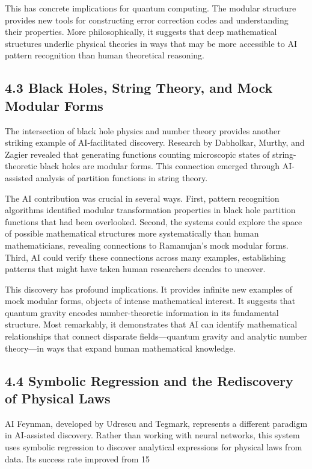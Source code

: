 \documentclass{article}
\begin{document}
This has concrete implications for quantum computing. The modular structure provides new tools for constructing error correction codes and understanding their properties. More philosophically, it suggests that deep mathematical structures underlie physical theories in ways that may be more accessible to AI pattern recognition than human theoretical reasoning.


\subsection{4.3 Black Holes, String Theory, and Mock Modular Forms}

The intersection of black hole physics and number theory provides another striking example of AI-facilitated discovery. Research by Dabholkar, Murthy, and Zagier revealed that generating functions counting microscopic states of string-theoretic black holes are modular forms. This connection emerged through AI-assisted analysis of partition functions in string theory.


The AI contribution was crucial in several ways. First, pattern recognition algorithms identified modular transformation properties in black hole partition functions that had been overlooked. Second, the systems could explore the space of possible mathematical structures more systematically than human mathematicians, revealing connections to Ramanujan's mock modular forms. Third, AI could verify these connections across many examples, establishing patterns that might have taken human researchers decades to uncover.


This discovery has profound implications. It provides infinite new examples of mock modular forms, objects of intense mathematical interest. It suggests that quantum gravity encodes number-theoretic information in its fundamental structure. Most remarkably, it demonstrates that AI can identify mathematical relationships that connect disparate fields—quantum gravity and analytic number theory—in ways that expand human mathematical knowledge.


\subsection{4.4 Symbolic Regression and the Rediscovery of Physical Laws}

AI Feynman, developed by Udrescu and Tegmark, represents a different paradigm in AI-assisted discovery. Rather than working with neural networks, this system uses symbolic regression to discover analytical expressions for physical laws from data. Its success rate improved from 15%
\end{document}
